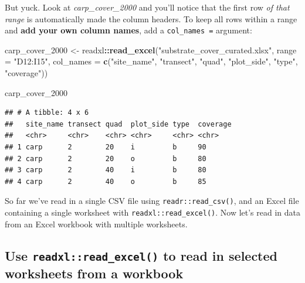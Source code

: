 \documentclass[]{book}
\newenvironment{Shaded}{\begin{snugshade}}{\end{snugshade}}
\newcommand{\DataTypeTok}[1]{\textcolor[rgb]{0.13,0.29,0.53}{#1}}
\newcommand{\DecValTok}[1]{\textcolor[rgb]{0.00,0.00,0.81}{#1}}
\newcommand{\KeywordTok}[1]{\textcolor[rgb]{0.13,0.29,0.53}{\textbf{#1}}}
\newcommand{\NormalTok}[1]{#1}
\newcommand{\OperatorTok}[1]{\textcolor[rgb]{0.81,0.36,0.00}{\textbf{#1}}}
\newcommand{\StringTok}[1]{\textcolor[rgb]{0.31,0.60,0.02}{#1}}
\begin{document}
But yuck. Look at \emph{carp\_cover\_2000} and you'll notice that the first row \emph{of that range} is automatically made the column headers. To keep all rows within a range and \textbf{add your own column names}, add a \texttt{col\_names\ =} argument:

\begin{Shaded}
\begin{Highlighting}[]
\NormalTok{carp_cover_}\DecValTok{2000}\NormalTok{ <-}\StringTok{ }\NormalTok{readxl}\OperatorTok{::}\KeywordTok{read_excel}\NormalTok{(}\StringTok{"substrate_cover_curated.xlsx"}\NormalTok{, }\DataTypeTok{range =} \StringTok{"D12:I15"}\NormalTok{, }\DataTypeTok{col_names =} \KeywordTok{c}\NormalTok{(}\StringTok{"site_name"}\NormalTok{, }\StringTok{"transect"}\NormalTok{, }\StringTok{"quad"}\NormalTok{, }\StringTok{"plot_side"}\NormalTok{, }\StringTok{"type"}\NormalTok{, }\StringTok{"coverage"}\NormalTok{))}
\end{Highlighting}
\end{Shaded}

\begin{Shaded}
\begin{Highlighting}[]
\NormalTok{carp_cover_}\DecValTok{2000}
\end{Highlighting}
\end{Shaded}

\begin{verbatim}
## # A tibble: 4 x 6
##   site_name transect quad  plot_side type  coverage
##   <chr>     <chr>    <chr> <chr>     <chr> <chr>   
## 1 carp      2        20    i         b     90      
## 2 carp      2        20    o         b     80      
## 3 carp      2        40    i         b     80      
## 4 carp      2        40    o         b     85
\end{verbatim}

So far we've read in a single CSV file using \texttt{readr::read\_csv()}, and an Excel file containing a single worksheet with \texttt{readxl::read\_excel()}. Now let's read in data from an Excel workbook with multiple worksheets.

\hypertarget{use-readxlread_excel-to-read-in-selected-worksheets-from-a-workbook}{%
\subsection{\texorpdfstring{Use \texttt{readxl::read\_excel()} to read in selected worksheets from a workbook}{Use readxl::read\_excel() to read in selected worksheets from a workbook}}\label{use-readxlread_excel-to-read-in-selected-worksheets-from-a-workbook}}
\end{document}
